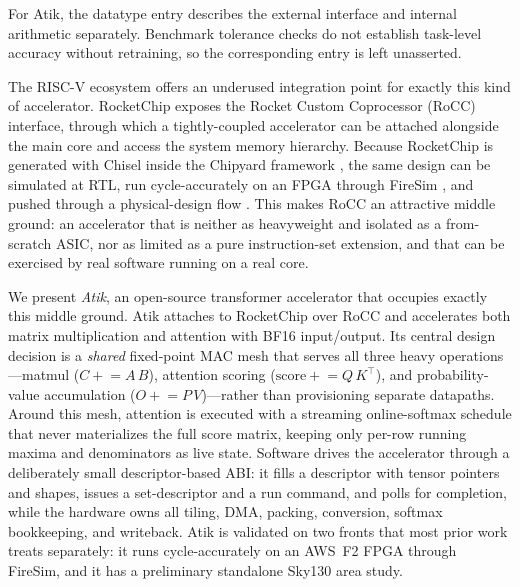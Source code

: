 \documentclass[sigconf,nonacm]{acmart}
\begin{document}
For Atik, the datatype entry describes the external interface and internal
arithmetic separately. Benchmark tolerance checks do not establish task-level
accuracy without retraining, so the corresponding entry is left unasserted.


The RISC-V ecosystem offers an underused integration point for exactly this
kind of accelerator. RocketChip \cite{rocketSoC} exposes the Rocket Custom
Coprocessor (RoCC)
interface, through which a tightly-coupled accelerator can be attached
alongside the main core and access the system memory hierarchy. Because
RocketChip is generated with Chisel \cite{chisellang} inside the
Chipyard framework \cite{chipyard}, the same design can be simulated at RTL,
run cycle-accurately on an FPGA through FireSim \cite{firesim}, and pushed
through a physical-design flow \cite{hammer}. This makes RoCC an attractive
middle ground: an accelerator that is neither as heavyweight and isolated as a
from-scratch ASIC, nor as limited as a pure instruction-set extension, and that
can be exercised by real software running on a real core.

We present \emph{Atik}, an open-source transformer accelerator that occupies
exactly this middle ground. Atik attaches to RocketChip over RoCC and
accelerates both matrix multiplication and attention with BF16 input/output. Its
central design decision is a \emph{shared} fixed-point MAC mesh that serves all
three heavy operations---matmul ($C \mathrel{+}= A\,B$), attention scoring
($\mathrm{score} \mathrel{+}= Q\,K^\top$), and probability-value accumulation
($O \mathrel{+}= P\,V$)---rather than provisioning separate datapaths. Around
this mesh, attention is executed with a streaming online-softmax schedule that
never materializes the full score matrix, keeping only per-row running maxima
and denominators as live state. Software drives the accelerator through a
deliberately small descriptor-based ABI: it fills a descriptor with tensor
pointers and shapes, issues a set-descriptor and a run command, and polls for
completion, while the hardware owns all tiling, DMA, packing, conversion,
softmax bookkeeping, and writeback. Atik is validated on two fronts that most
prior work treats separately: it runs cycle-accurately on an AWS~F2 FPGA
through FireSim, and it has a preliminary standalone Sky130 area study.
\end{document}
